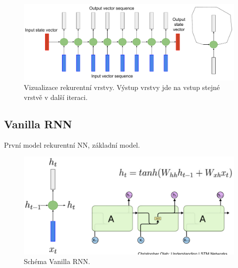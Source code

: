 \begin{figure}[H]
    \centering
    \includegraphics[width=1\linewidth]{recurrent.pdf}
    \caption{Vizualizace rekurentní vrstvy. Výstup vrstvy jde na vstup stejné vrstvě v další iteraci.}
\end{figure}

\subsection{Vanilla RNN}

\begin{compactitem}
    \item První model rekurentní NN, základní model.
\end{compactitem}

\begin{figure}[H]
    \centering
    \includegraphics[width=1\linewidth]{rnn-vanilla.pdf}
    \caption{Schéma Vanilla RNN.}
\end{figure}
